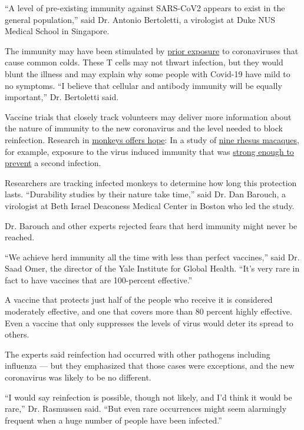``A level of pre-existing immunity against SARS-CoV2 appears to exist in
the general population,'' said Dr. Antonio Bertoletti, a virologist at
Duke NUS Medical School in Singapore.

The immunity may have been stimulated by
\href{https://immunology.sciencemag.org/content/5/48/eabd2071}{prior
exposure} to coronaviruses that cause common colds. These T cells may
not thwart infection, but they would blunt the illness and may explain
why some people with Covid-19 have mild to no symptoms. ``I believe that
cellular and antibody immunity will be equally important,'' Dr.
Bertoletti said.

Vaccine trials that closely track volunteers may deliver more
information about the nature of immunity to the new coronavirus and the
level needed to block reinfection. Research in
\href{https://science.sciencemag.org/content/early/2020/07/01/science.abc5343}{monkeys
offers hope}: In a study of
\href{https://science.sciencemag.org/content/early/2020/05/19/science.abc4776}{nine
rhesus macaques}, for example, exposure to the virus induced immunity
that was
\href{https://www.nytimes.com/2020/05/20/health/coronavirus-vaccine-harvard.html}{strong
enough to prevent} a second infection.

Researchers are tracking infected monkeys to determine how long this
protection lasts. ``Durability studies by their nature take time,'' said
Dr. Dan Barouch, a virologist at Beth Israel Deaconess Medical Center in
Boston who led the study.

Dr. Barouch and other experts rejected fears that herd immunity might
never be reached.

``We achieve herd immunity all the time with less than perfect
vaccines,'' said Dr. Saad Omer, the director of the Yale Institute for
Global Health. ``It's very rare in fact to have vaccines that are
100-percent effective.''

A vaccine that protects just half of the people who receive it is
considered moderately effective, and one that covers more than 80
percent highly effective. Even a vaccine that only suppresses the levels
of virus would deter its spread to others.

The experts said reinfection had occurred with other pathogens including
influenza --- but they emphasized that those cases were exceptions, and
the new coronavirus was likely to be no different.

``I would say reinfection is possible, though not likely, and I'd think
it would be rare,'' Dr. Rasmussen said. ``But even rare occurrences
might seem alarmingly frequent when a huge number of people have been
infected.''

